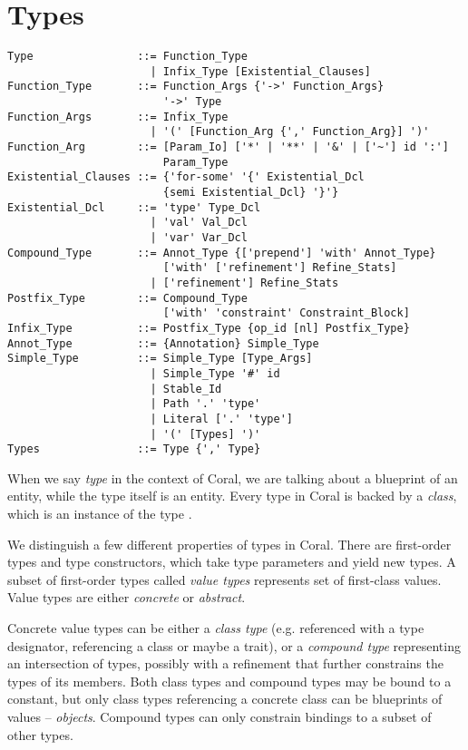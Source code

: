 
\chapter{Types}

\syntax\begin{lstlisting}
Type                ::= Function_Type
                      | Infix_Type [Existential_Clauses]
Function_Type       ::= Function_Args {'->' Function_Args} 
                        '->' Type
Function_Args       ::= Infix_Type
                      | '(' [Function_Arg {',' Function_Arg}] ')'
Function_Arg        ::= [Param_Io] ['*' | '**' | '&' | ['~'] id ':'] 
                        Param_Type
Existential_Clauses ::= {'for-some' '{' Existential_Dcl
                        {semi Existential_Dcl} '}'}
Existential_Dcl     ::= 'type' Type_Dcl
                      | 'val' Val_Dcl
                      | 'var' Var_Dcl
Compound_Type       ::= Annot_Type {['prepend'] 'with' Annot_Type} 
                        ['with' ['refinement'] Refine_Stats]
                      | ['refinement'] Refine_Stats
Postfix_Type        ::= Compound_Type 
                        ['with' 'constraint' Constraint_Block]
Infix_Type          ::= Postfix_Type {op_id [nl] Postfix_Type}
Annot_Type          ::= {Annotation} Simple_Type
Simple_Type         ::= Simple_Type [Type_Args]
                      | Simple_Type '#' id
                      | Stable_Id
                      | Path '.' 'type'
                      | Literal ['.' 'type']
                      | '(' [Types] ')'
Types               ::= Type {',' Type}
\end{lstlisting}

When we say \textit{type} in the context of Coral, we are talking about a blueprint of an entity, while the type itself is an entity. Every type in Coral is backed by a \textit{class}, which is an instance of the type \lstinline@Class@. 

We distinguish a few different properties of types in Coral. There are first-order types and type constructors, which take type parameters and yield new types. A subset of first-order types called \textit{value types} represents set of first-class values. Value types are either \textit{concrete} or \textit{abstract}. 

Concrete value types can be either a \textit{class type} (e.g. referenced with a type designator, referencing a class or maybe a trait), or a \textit{compound type} representing an intersection of types, possibly with a refinement that further constrains the types of its members. Both class types and compound types may be bound to a constant, but only class types referencing a concrete class can be blueprints of values -- \textit{objects}. Compound types can only constrain bindings to a subset of other types. 

